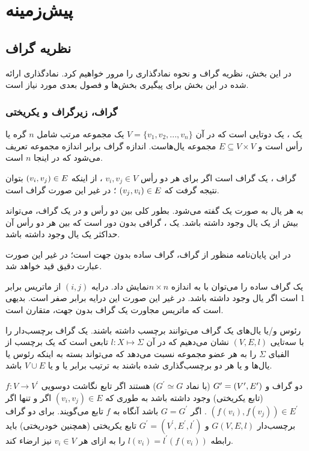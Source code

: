 \chapter{پیش‌زمینه}\label{chap:prerequisites}
\clearpage
\section{نظریه گراف}
در این بخش، نظریه گراف و نحوه نمادگذاری‌ را مرور خواهیم کرد. نمادگذاری ارائه شده در این بخش برای پیگیری بخش‌ها و فصول بعدی مورد نیاز است.

\subsection{گراف، زیرگراف و یکریختی}
یک ، یک دوتایی  است که در آن
$V = \{v_{1},v_{2},...,v_{n}\}$
یک مجموعه مرتب شامل $n$ گره‌ یا رأس است و
$E \subseteq V\times V$
مجموعه یال‌هاست. اندازه گراف برابر اندازه مجموعه \V تعریف می‌شود که در اینجا $n$ است.

گراف ، یک گراف  است اگر برای هر دو رأس
$v_{i},v_{j} \in V$
، از اینکه
$(v_{i},v_{j}) \in E$
بتوان نتیجه گرفت که
$(v_{j},v_{i}) \in E$
؛ در غیر این صورت گراف  است.

به هر یال به صورت 
یک  گفته می‌شود. بطور کلی بین دو رأس \Vi و \Vj در یک گراف، می‌تواند بیش از یک یال وجود داشته باشد. یک ، گرافی بدون دور است که بین هر دو رأس آن حداکثر یک یال وجود داشته باشد.

در این پایان‌نامه منظور از گراف، گراف ساده بدون جهت است؛ در غیر این صورت عبارت دقیق قید خواهد شد.

یک گراف ساده را می‌توان با  \A به اندازه $n\times n$نمایش داد. درایه $(i,j)$ از ماتریس \A برابر 1 است اگر یال  وجود داشته باشد. در غیر این صورت این درایه برابر صفر است. بدیهی است که ماتریس مجاورت یک گراف بدون جهت، متقارن است.

رئوس و/یا یال‌های یک گراف می‌توانند برچسب داشته باشند. یک گراف برچسب‌دار را با سه‌تایی $(V,E,l)$ نشان می‌دهیم که در آن $l: X \mapsto \Sigma$ تابعی است که یک برچسب از الفبای $\Sigma$ را به هر عضو مجموعه \X نسبت می‌دهد که \X می‌تواند بسته به اینکه رئوس یا یال‌ها و یا هر دو برچسب‌گذاری شده باشند به ترتیب برابر \V یا \E و یا $V\cup E$ باشد.

دو گراف  و
$G^{\prime} = (V^{\prime},E^{\prime})$
 (با نماد $G^{\prime} \simeq G$) هستند اگر تابع نگاشت دوسویی $f: V \rightarrow V^{\prime}$ (تابع یکریختی) وجود داشته باشد به طوری که
$(v_{i},v_{j}) \in E$
اگر و تنها اگر
$(f(v_{i}),f(v_{j})) \in E^{\prime}$
. اگر $G = G^{\prime}$ باشد آنگاه به $f$ تابع  می‌گویند. برای دو گراف برچسب‌دار $G(V,E,l)$ و $G^{\prime} = (V^{\prime},E^{\prime},l^{\prime})$ تابع یکریختی (همچنین خودریختی) باید رابطه 
$l(v_{i}) = l^{\prime}(f(v_{i}))$
 را به ازای هر $v_{i} \in V$ نیز ارضاء کند.
 
